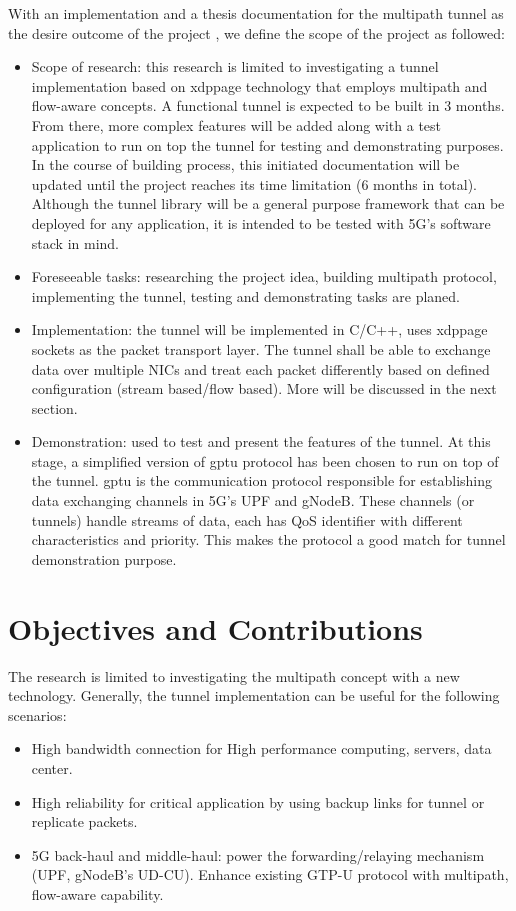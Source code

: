 With an implementation and a thesis documentation for the multipath tunnel as the desire outcome of the project , we define the scope of the project as followed:
\begin{itemize}
    \item Scope of research: this research is limited to investigating a tunnel implementation based on \ac{xdppage} technology that employs multipath and flow-aware concepts. A functional tunnel is expected to be built in 3 months. From there, more complex features will be added along with a test application to run on top the tunnel for testing and demonstrating purposes. In the course of building process, this initiated documentation will be updated until the project reaches its time limitation (6 months in total). Although the tunnel library will be a general purpose framework that can be deployed for any application, it is intended to be tested with 5G's software stack in mind.
    \item Foreseeable tasks: researching the project idea, building multipath protocol, implementing the tunnel, testing and demonstrating tasks are planed. 
    \item Implementation: the tunnel will be implemented in C/C++, uses \ac{xdppage} sockets as the packet transport layer. The tunnel shall be able to exchange data over multiple \ac{NIC}s and treat each packet differently based on defined configuration (stream based/flow based). More will be discussed in the next section.
    \item Demonstration: used to test and present the features of the tunnel. At this stage, a simplified version of \ac{gptu} protocol has been chosen to run on top of the tunnel. \ac{gptu} is the communication protocol responsible for establishing data exchanging channels in 5G's \ac{UPF} and gNodeB. These channels (or tunnels) handle streams of data, each has \ac{QoS} identifier with different characteristics and priority. This makes the protocol a good match for tunnel demonstration purpose.
\end{itemize}


\section{Objectives and Contributions}
The research is limited to investigating the multipath concept with a new technology. 
Generally, the tunnel implementation can be useful for the following scenarios:
\begin{itemize}
    \item High bandwidth connection for High performance computing, servers, data center.
    \item High reliability for critical application by using backup links for tunnel or replicate packets.
    \item 5G back-haul and middle-haul: power the forwarding/relaying mechanism (\ac{UPF}, gNodeB's UD-CU). Enhance existing GTP-U protocol with multipath, flow-aware capability.
\end{itemize}

